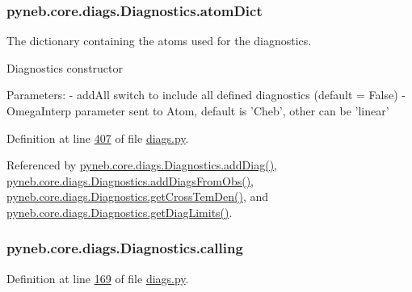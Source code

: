 \subsubsection[{atom\+Dict}]{\setlength{\rightskip}{0pt plus 5cm}pyneb.\+core.\+diags.\+Diagnostics.\+atom\+Dict}\label{classpyneb_1_1core_1_1diags_1_1_diagnostics_a36301f268745b33abe6cfeb3e41a6356}


The dictionary containing the atoms used for the diagnostics. 

\begin{DoxyVerb}Diagnostics constructor

Parameters:
    - addAll        switch to include all defined diagnostics (default = False)
    - OmegaInterp   parameter sent to Atom, default is 'Cheb', other can be 'linear'\end{DoxyVerb}
 

Definition at line \hyperlink{diags_8py_source_l00407}{407} of file \hyperlink{diags_8py_source}{diags.\+py}.



Referenced by \hyperlink{diags_8py_source_l00246}{pyneb.\+core.\+diags.\+Diagnostics.\+add\+Diag()}, \hyperlink{diags_8py_source_l00353}{pyneb.\+core.\+diags.\+Diagnostics.\+add\+Diags\+From\+Obs()}, \hyperlink{diags_8py_source_l00554}{pyneb.\+core.\+diags.\+Diagnostics.\+get\+Cross\+Tem\+Den()}, and \hyperlink{diags_8py_source_l00706}{pyneb.\+core.\+diags.\+Diagnostics.\+get\+Diag\+Limits()}.

\hypertarget{classpyneb_1_1core_1_1diags_1_1_diagnostics_a07dce673fec8b2383ef411ab94b0b2fe}{}
\subsubsection[{calling}]{\setlength{\rightskip}{0pt plus 5cm}pyneb.\+core.\+diags.\+Diagnostics.\+calling}\label{classpyneb_1_1core_1_1diags_1_1_diagnostics_a07dce673fec8b2383ef411ab94b0b2fe}


Definition at line \hyperlink{diags_8py_source_l00169}{169} of file \hyperlink{diags_8py_source}{diags.\+py}.




